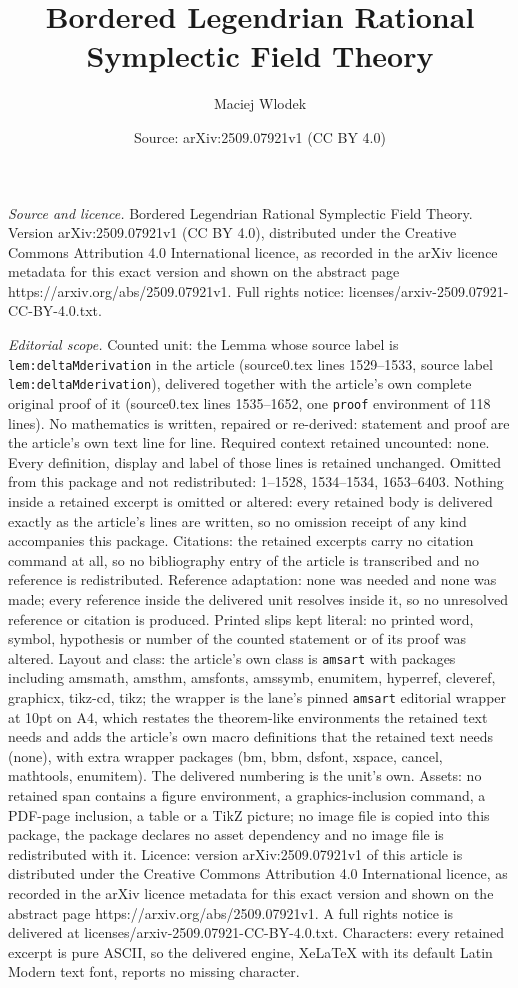 \documentclass[10pt,a4paper]{amsart}
\title[Bordered Legendrian Rational Symplectic Field Theory]{Bordered Legendrian Rational Symplectic Field Theory}
\author{Maciej Wlodek}
\date{Source: arXiv:2509.07921v1 (CC BY 4.0)}
\begin{document}
\maketitle

\noindent\emph{Source and licence.} Bordered Legendrian Rational Symplectic Field Theory. Version arXiv:2509.07921v1 (CC BY 4.0), distributed under the Creative Commons Attribution 4.0 International licence, as recorded in the arXiv licence metadata for this exact version and shown on the abstract page https://arxiv.org/abs/2509.07921v1. Full rights notice: licenses/arxiv-2509.07921-CC-BY-4.0.txt.\par\smallskip

\noindent\textit{Editorial scope.} Counted unit: the Lemma whose source label is \texttt{lem:deltaMderivation} in the article (source0.tex lines 1529--1533, source label \texttt{lem:deltaMderivation}), delivered together with the article's own complete original proof of it (source0.tex lines 1535--1652, one \texttt{proof} environment of 118 lines). No mathematics is written, repaired or re-derived: statement and proof are the article's own text line for line. Required context retained uncounted: none. Every definition, display and label of those lines is retained unchanged. Omitted from this package and not redistributed: 1--1528, 1534--1534, 1653--6403. Nothing inside a retained excerpt is omitted or altered: every retained body is delivered exactly as the article's lines are written, so no omission receipt of any kind accompanies this package. Citations: the retained excerpts carry no citation command at all, so no bibliography entry of the article is transcribed and no reference is redistributed. Reference adaptation: none was needed and none was made; every reference inside the delivered unit resolves inside it, so no unresolved reference or citation is produced. Printed slips kept literal: no printed word, symbol, hypothesis or number of the counted statement or of its proof was altered. Layout and class: the article's own class is \texttt{amsart} with packages including amsmath, amsthm, amsfonts, amssymb, enumitem, hyperref, cleveref, graphicx, tikz-cd, tikz; the wrapper is the lane's pinned \texttt{amsart} editorial wrapper at 10pt on A4, which restates the theorem-like environments the retained text needs and adds the article's own macro definitions that the retained text needs (none), with extra wrapper packages (bm, bbm, dsfont, xspace, cancel, mathtools, enumitem). The delivered numbering is the unit's own. Assets: no retained span contains a figure environment, a graphics-inclusion command, a PDF-page inclusion, a table or a TikZ picture; no image file is copied into this package, the package declares no asset dependency and no image file is redistributed with it. Licence: version arXiv:2509.07921v1 of this article is distributed under the Creative Commons Attribution 4.0 International licence, as recorded in the arXiv licence metadata for this exact version and shown on the abstract page https://arxiv.org/abs/2509.07921v1. A full rights notice is delivered at licenses/arxiv-2509.07921-CC-BY-4.0.txt. Characters: every retained excerpt is pure ASCII, so the delivered engine, XeLaTeX with its default Latin Modern text font, reports no missing character.
\end{document}
